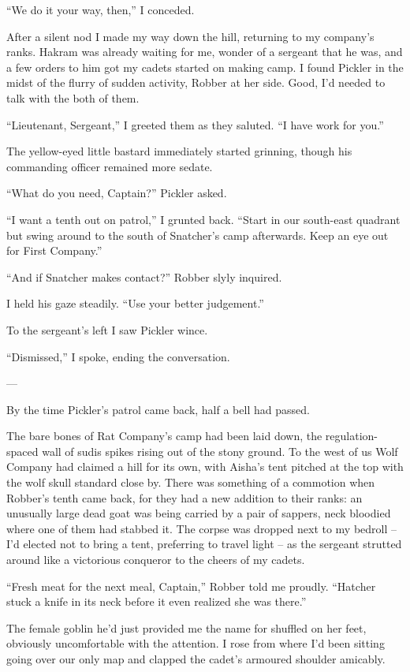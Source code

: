 \documentclass[12pt, openany]{book}
\begin{document}
“We do it your way, then,” I conceded. 

After a silent nod I made my way down the hill, returning to my company’s ranks. Hakram was already waiting for me, wonder of a sergeant that he was, and a few orders to him got my cadets started on making camp. I found Pickler in the midst of the flurry of sudden activity, Robber at her side. Good, I’d needed to talk with the both of them.

“Lieutenant, Sergeant,” I greeted them as they saluted. “I have work for you.”

The yellow-eyed little bastard immediately started grinning, though his commanding officer remained more sedate.

“What do you need, Captain?” Pickler asked.

“I want a tenth out on patrol,” I grunted back. “Start in our south-east quadrant but swing around to the south of Snatcher’s camp afterwards. Keep an eye out for First Company.”

“And if Snatcher makes contact?” Robber slyly inquired.

I held his gaze steadily. “Use your better judgement.”

To the sergeant’s left I saw Pickler wince.

“Dismissed,” I spoke, ending the conversation.

—

By the time Pickler’s patrol came back, half a bell had passed. 

The bare bones of Rat Company’s camp had been laid down, the regulation-spaced wall of sudis spikes rising out of the stony ground. To the west of us Wolf Company had claimed a hill for its own, with Aisha’s tent pitched at the top with the wolf skull standard close by. There was something of a commotion when Robber’s tenth came back, for they had a new addition to their ranks: an unusually large dead goat was being carried by a pair of sappers, neck bloodied where one of them had stabbed it. The corpse was dropped next to my bedroll – I’d elected not to bring a tent, preferring to travel light – as the sergeant strutted around like a victorious conqueror to the cheers of my cadets.

“Fresh meat for the next meal, Captain,” Robber told me proudly. “Hatcher stuck a knife in its neck before it even realized she was there.”

The female goblin he’d just provided me the name for shuffled on her feet, obviously uncomfortable with the attention. I rose from where I’d been sitting going over our only map and clapped the cadet’s armoured shoulder amicably.
\end{document}
